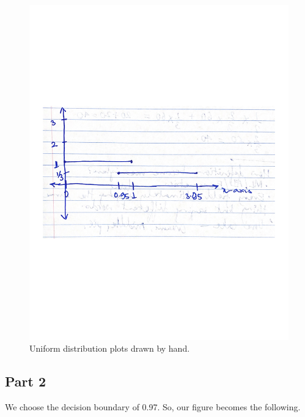 \documentclass{article}
\begin{document}
\begin{figure}[H]
	\centering
    \includegraphics[width=\textwidth]{part2a.pdf}
    \caption{Uniform distribution plots drawn by hand.}
    \label{fig:plot3}
\end{figure}

\subsection*{Part 2}

We choose the decision boundary of 0.97. So, our figure becomes the following.
\end{document}
